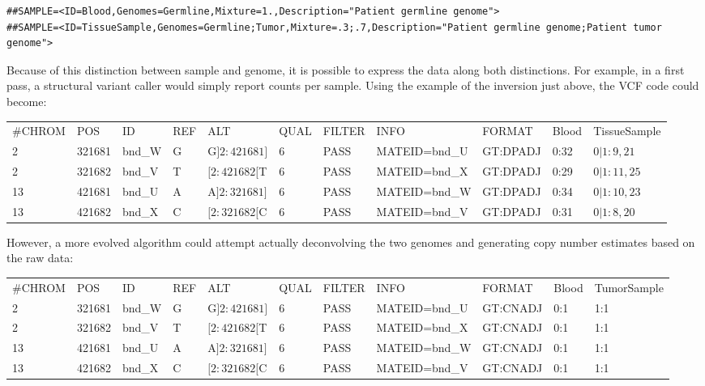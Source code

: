 \documentclass[8pt]{article}
\begin{document}
\footnotesize
\begin{verbatim}
##SAMPLE=<ID=Blood,Genomes=Germline,Mixture=1.,Description="Patient germline genome">
##SAMPLE=<ID=TissueSample,Genomes=Germline;Tumor,Mixture=.3;.7,Description="Patient germline genome;Patient tumor genome">
\end{verbatim}
\normalsize

Because of this distinction between sample and genome, it is possible to express the data along both distinctions.
For example, in a first pass, a structural variant caller would simply report counts per sample.
Using the example of the inversion just above, the VCF code could become:

\vspace{0.3cm}
\tiny
\begin{flushleft}
\begin{tabular}{ l l l l l l l l l l l }
\#CHROM & POS & ID & REF & ALT & QUAL & FILTER & INFO & FORMAT & Blood & TissueSample\\
2 & 321681 & bnd\_W & G & G$]2:421681]$ & 6 & PASS & MATEID=bnd\_U & GT:DPADJ & 0:32 & $0|1:9,21$ \\
2 & 321682 & bnd\_V & T & $[2:421682[$T & 6 & PASS & MATEID=bnd\_X & GT:DPADJ & 0:29 & $0|1:11,25$ \\
13 & 421681 & bnd\_U & A & A$]2:321681]$ & 6 & PASS & MATEID=bnd\_W & GT:DPADJ & 0:34 & $0|1:10,23$ \\
13 & 421682 & bnd\_X & C & $[2:321682[$C & 6 & PASS & MATEID=bnd\_V & GT:DPADJ & 0:31 & $0|1:8,20$ \\
\end{tabular}
\end{flushleft}
\normalsize
\vspace{0.3cm}

However, a more evolved algorithm could attempt actually deconvolving the two genomes and generating copy number estimates based on the raw data:

\vspace{0.3cm}
\tiny
\begin{flushleft}
\begin{tabular}{ l l l l l l l l l l l }
\#CHROM & POS & ID & REF & ALT & QUAL & FILTER & INFO & FORMAT & Blood & TumorSample \\
2 & 321681 & bnd\_W & G & G$]2:421681]$ & 6 & PASS & MATEID=bnd\_U & GT:CNADJ & 0:1 & 1:1 \\
2 & 321682 & bnd\_V & T & $[2:421682[$T & 6 & PASS & MATEID=bnd\_X & GT:CNADJ & 0:1 & 1:1 \\
13 & 421681 & bnd\_U & A & A$]2:321681]$ & 6 & PASS & MATEID=bnd\_W & GT:CNADJ & 0:1 & 1:1 \\
13 & 421682 & bnd\_X & C & $[2:321682[$C & 6 & PASS & MATEID=bnd\_V & GT:CNADJ & 0:1 & 1:1 \\
\end{tabular}
\end{flushleft}
\normalsize
\end{document}
